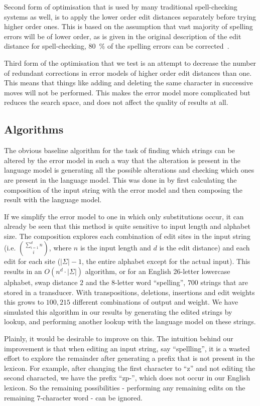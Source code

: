 \documentclass[11pt]{article}
\begin{document}
Second form of optimisation that is used by many traditional spell-checking
systems as well, is to apply the lower order edit distances separately before
trying higher order ones. This is based on the assumption that vast majority
of spelling errors will be of lower order, as is given in the original
description of the edit distance for spell-checking, 80~\% of the spelling
errors can be corrected~\cite{Pollock/1984}.

Third form of the optimisation that we test is an attempt to decrease the
number of redundant corrections in error models of higher order edit distances
than one. This means that things like  adding and deleting the
same character in successive moves will not be performed. This makes the error
model more complicated but reduces the search space, and does not affect the
quality of results at all.

\subsection{Algorithms}
\label{sec:algorithms}
The obvious baseline algorithm for the task of finding which strings can be
altered by the error model in such a way that the alteration is present in the
language model is generating all the possible alterations and checking which
ones are present in the language model. This was done in 
by first calculating the composition of the input string with the error
model and then composing the result with the language model.

If we simplify the error model to one in which only substitutions occur, it can
already be seen that this method is quite sensitive to input length and
alphabet size. The composition explores each combination of edit sites in the
input string (i.e. $\sum_{i=1}^d n \choose i$, where $n$ is the input length
and $d$ is the edit distance) and each edit for each site ($|\Sigma| - 1$, the
entire alphabet except for the actual input). This results in an $O(n^d \cdot
|\Sigma|)$ algorithm, or for an English 26-letter lowercase alphabet, swap
distance $2$ and the $8$-letter word ``spelling'', $700$ strings that are
stored in a transducer. With transpositions, deletions, insertions and edit
weights this grows to $100,215$ different combinations of output and weight. We
have simulated this algorithm in our results by generating the edited strings
by lookup, and performing another lookup with the language model on these
strings.

Plainly, it would be desirable to improve on this. The intuition behind our
improvement is that when editing an input string, say ``spellling'', it is a
wasted effort to explore the remainder after generating a prefix that is not
present in the lexicon. For example, after changing the first character to ``z''
and not editing the second characted, we have the prefix ``zp-'', which does
not occur in our English lexicon. So the remaining possibilities - performing
any remaining edits on the remaining $7$-character word - can be ignored.
\end{document}
